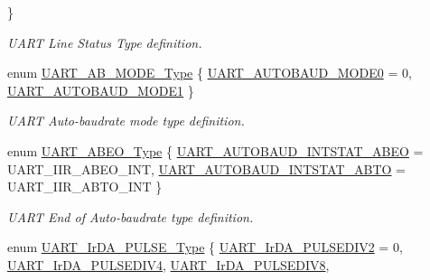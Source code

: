 \begin{DoxyCompactItemize}
 \}
\begin{DoxyCompactList}\small\item\em \-U\-A\-R\-T \-Line \-Status \-Type definition. \end{DoxyCompactList}\item 
enum \hyperlink{group___u_a_r_t___public___types_ga0a6689108a4f3651d2188ea8a2c17d4a}{\-U\-A\-R\-T\-\_\-\-A\-B\-\_\-\-M\-O\-D\-E\-\_\-\-Type} \{ \hyperlink{group___u_a_r_t___public___types_gga0a6689108a4f3651d2188ea8a2c17d4aabc4d62d047a6bc05fc2642091508c97a}{\-U\-A\-R\-T\-\_\-\-A\-U\-T\-O\-B\-A\-U\-D\-\_\-\-M\-O\-D\-E0} =  0, 
\hyperlink{group___u_a_r_t___public___types_gga0a6689108a4f3651d2188ea8a2c17d4aae7ac1b0008b5c99529b71d970969761f}{\-U\-A\-R\-T\-\_\-\-A\-U\-T\-O\-B\-A\-U\-D\-\_\-\-M\-O\-D\-E1}
 \}
\begin{DoxyCompactList}\small\item\em \-U\-A\-R\-T \-Auto-\/baudrate mode type definition. \end{DoxyCompactList}\item 
enum \hyperlink{group___u_a_r_t___public___types_ga85f8df03cce76ca8e9404364a3b68487}{\-U\-A\-R\-T\-\_\-\-A\-B\-E\-O\-\_\-\-Type} \{ \hyperlink{group___u_a_r_t___public___types_gga85f8df03cce76ca8e9404364a3b68487a7e069f3443610ab3ea485eeb60927541}{\-U\-A\-R\-T\-\_\-\-A\-U\-T\-O\-B\-A\-U\-D\-\_\-\-I\-N\-T\-S\-T\-A\-T\-\_\-\-A\-B\-E\-O} =  \-U\-A\-R\-T\-\_\-\-I\-I\-R\-\_\-\-A\-B\-E\-O\-\_\-\-I\-N\-T, 
\hyperlink{group___u_a_r_t___public___types_gga85f8df03cce76ca8e9404364a3b68487a22d6547b0202ba587cea84a30ad41668}{\-U\-A\-R\-T\-\_\-\-A\-U\-T\-O\-B\-A\-U\-D\-\_\-\-I\-N\-T\-S\-T\-A\-T\-\_\-\-A\-B\-T\-O} =  \-U\-A\-R\-T\-\_\-\-I\-I\-R\-\_\-\-A\-B\-T\-O\-\_\-\-I\-N\-T
 \}
\begin{DoxyCompactList}\small\item\em \-U\-A\-R\-T \-End of \-Auto-\/baudrate type definition. \end{DoxyCompactList}\item 
enum \hyperlink{group___u_a_r_t___public___types_ga2e41fe7d668367ce455940f7dfde1d92}{\-U\-A\-R\-T\-\_\-\-Ir\-D\-A\-\_\-\-P\-U\-L\-S\-E\-\_\-\-Type} \{ \*
\hyperlink{group___u_a_r_t___public___types_gga2e41fe7d668367ce455940f7dfde1d92ad0cefa4f2f3e4573e123c3f3479bb139}{\-U\-A\-R\-T\-\_\-\-Ir\-D\-A\-\_\-\-P\-U\-L\-S\-E\-D\-I\-V2} =  0, 
\hyperlink{group___u_a_r_t___public___types_gga2e41fe7d668367ce455940f7dfde1d92a71f627b0056af2048e3c2b58c8de5910}{\-U\-A\-R\-T\-\_\-\-Ir\-D\-A\-\_\-\-P\-U\-L\-S\-E\-D\-I\-V4}, 
\hyperlink{group___u_a_r_t___public___types_gga2e41fe7d668367ce455940f7dfde1d92adfbe55864dea0b5a610ba59f014148f7}{\-U\-A\-R\-T\-\_\-\-Ir\-D\-A\-\_\-\-P\-U\-L\-S\-E\-D\-I\-V8}, 

\end{DoxyCompactItemize}
